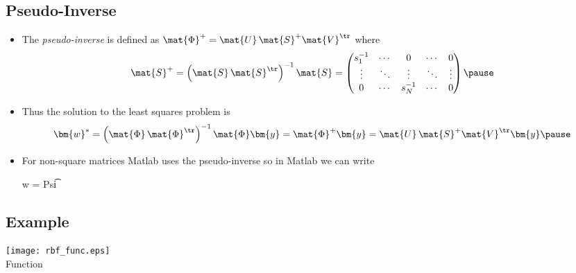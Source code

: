 \begin{slide}
\section[-1]{Pseudo-Inverse}

\begin{PauseHighLight}

\begin{itemize}
\item The \emph{pseudo-inverse} is defined as
  $\mat{\Phi}^{+} = \mat{U} \, \mat{S}^{+} \mat{V}^\tr$ where
  \begin{displaymath}
    \mat{S}^{+} = \left(\mat{S}\,\mat{S}^\tr\right)^{-1} \mat{S}  =
    \begin{pmatrix}
      s_1^{-1} & \cdots & 0 & \cdots & 0 \\
      \vdots & \ddots & \vdots & \ddots & \vdots \\
      0 & \cdots & s_N^{-1} & \cdots & 0
    \end{pmatrix}\pause
  \end{displaymath}
\item Thus the solution to the least squares problem is
  \begin{displaymath}
    \bm{w}^{*} = \left(\mat{\Phi}\,\mat{\Phi}^\tr\right)^{-1}
    \mat{\Phi} \bm{y} = \mat{\Phi}^{+} \bm{y} = \mat{U} \, \mat{S}^{+}
    \mat{V}^\tr \bm{y} \pause
  \end{displaymath}
\item For non-square matrices Matlab uses the pseudo-inverse so in
  Matlab we can write
  \begin{matlab}
    w = Psi\t
  \end{matlab}\pause
\end{itemize}

\end{PauseHighLight}
\end{slide}


\begin{slide}
\section[-1.5]{Example}

\begin{PauseHighLight}

\begin{center}
  \texttt{[image: rbf\_func.eps]}\\
  Function
\end{center}
\end{PauseHighLight}
\end{slide}

